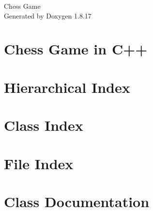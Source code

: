 \let\mypdfximage\pdfximage\def\pdfximage{\immediate\mypdfximage}\documentclass[twoside]{book}
\newcommand{\+}{\discretionary{\mbox{\scriptsize$\hookleftarrow$}}{}{}}
\newcommand{\clearemptydoublepage}{%
  \newpage{\pagestyle{empty}\cleardoublepage}%
}
\begin{document}
\hypersetup{pageanchor=false,
             bookmarksnumbered=true,
             pdfencoding=unicode
            }
\begin{titlepage}
\vspace*{7cm}
\begin{center}%
{\Large Chess Game }\\
\vspace*{1cm}
{\large Generated by Doxygen 1.8.17}\\
\end{center}
\end{titlepage}
\clearemptydoublepage
{}
\tableofcontents
\clearemptydoublepage
{}
\hypersetup{pageanchor=true}

\chapter{Chess Game in C++}
\label{md_README}

\chapter{Hierarchical Index}

\chapter{Class Index}

\chapter{File Index}

\chapter{Class Documentation}











\end{document}

